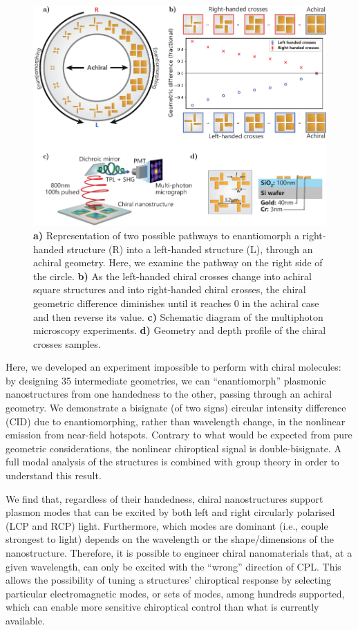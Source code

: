 \begin{figure}[htb]	
    \centering	
    \includegraphics[scale=1]{./figures/results/EnantiomorphingChiralCrosses/setup.pdf}
    \caption{\label{fig:results:EnantiomorphingChiralCrosses:setup}
    \textbf{a)} Representation of two possible pathways to enantiomorph a right-handed structure (R) into a left-handed structure (L), through an achiral geometry. Here, we examine the pathway on the right side of the circle. \textbf{b)} As the left-handed chiral crosses change into achiral square structures and into right-handed chiral crosses, the chiral geometric difference diminishes until it reaches 0 in the achiral case and then reverse its value. \textbf{c)} Schematic diagram of the multiphoton microscopy experiments. \textbf{d)} Geometry and depth profile of the chiral crosses samples.}	
\end{figure}

Here, we developed an experiment impossible to perform with chiral molecules: by designing 35 intermediate geometries, we can ``enantiomorph'' plasmonic nanostructures from one handedness to the other, passing through an achiral geometry. 
We demonstrate a bisignate (of two signs) circular intensity difference (CID) due to enantiomorphing, rather than wavelength change, in the nonlinear emission from near-field hotspots. Contrary to what would be expected from pure geometric considerations, the nonlinear chiroptical signal is double-bisignate. A full modal analysis of the structures is combined with group theory in order to understand this result. 

We find that, regardless of their handedness, chiral nanostructures support plasmon modes that can be excited by both left and right circularly polarised (LCP and RCP) light. Furthermore, which modes are dominant (i.e., couple strongest to light) depends on the wavelength or the shape/dimensions of the nanostructure. Therefore, it is possible to engineer chiral nanomaterials that, at a given wavelength, can only be excited with the ``wrong'' direction of CPL. 
This allows the possibility of tuning a structures' chiroptical response by selecting particular electromagnetic modes, or sets of modes, among hundreds supported, which can enable more sensitive chiroptical control than what is currently available.

